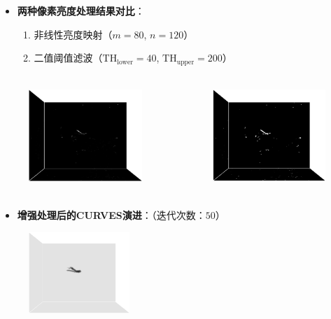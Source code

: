 \begin{frame}
\begin{itemize}
  \item \textbf{两种像素亮度处理结果对比}：
  \begin{enumerate}
     \item 非线性亮度映射（$m = 80$, $n = 120$）
     \item 二值阈值滤波（$\text{TH}_{\text{lower}} = 40$, $\text{TH}_{\text{upper}} = 200$）
  \end{enumerate}
\end{itemize}
\begin{columns}[b,onlytextwidth]
\begin{column}{.5\textwidth}
 \begin{figure}[t]
\centering
\includegraphics[height=1.5in]{../../Figures/coronary/coronary_enhanced/sigmoid.eps}
\end{figure}
\end{column}
\begin{column}{.5\textwidth}
 \begin{figure}[t]
\centering
\includegraphics[height=1.5in]{../../Figures/coronary/coronary_enhanced/binary2.eps}
\end{figure}
\end{column}
\end{columns}
\end{frame}

\begin{frame}
\begin{itemize}
  \item \textbf{增强处理后的CURVES演进}：（迭代次数：$50$）
\end{itemize}
\begin{figure}[t]
\centering
\includegraphics[width=1.5in]{../../Figures/coronary/coronary_enhanced/curves}
\end{figure}
\end{frame}

